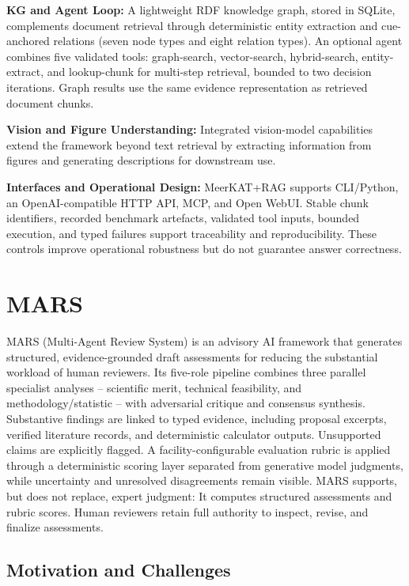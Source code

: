 \documentclass[11pt,twoside]{article}
\begin{document}
\noindent \textbf{KG and Agent Loop:} A lightweight RDF knowledge graph, stored in SQLite, complements document retrieval through deterministic entity extraction and cue-anchored relations (seven node types and eight relation types). An optional agent combines five validated tools: graph-search, vector-search, hybrid-search, entity-extract, and lookup-chunk for multi-step retrieval, bounded to two decision iterations. Graph results use the same evidence representation as retrieved document chunks.

\noindent \textbf{Vision and Figure Understanding:} Integrated vision-model capabilities extend the framework beyond text retrieval by extracting information from figures and generating descriptions for downstream use.

\noindent \textbf{Interfaces and Operational Design:} MeerKAT+RAG supports CLI/Python, an OpenAI-compatible HTTP API, MCP, and Open WebUI. Stable chunk identifiers, recorded benchmark artefacts, validated tool inputs, bounded execution, and typed failures support traceability and reproducibility. These controls improve operational robustness but do not guarantee answer correctness.

\section{MARS}

MARS (Multi-Agent Review System) is an advisory AI framework that generates structured, evidence-grounded draft assessments for reducing the substantial workload of human reviewers.
Its five-role pipeline combines three parallel specialist analyses -- scientific merit, technical feasibility, and methodology/statistic -- with adversarial critique and consensus synthesis.
Substantive findings are linked to typed evidence, including proposal excerpts, verified literature records, and deterministic calculator outputs.
Unsupported claims are explicitly flagged.
A facility-configurable evaluation rubric is applied through a deterministic scoring layer separated from generative model judgments, while uncertainty and unresolved disagreements remain visible.
MARS supports, but does not replace, expert judgment:
It computes structured assessments and rubric scores.
Human reviewers retain full authority to inspect, revise, and finalize assessments.

\subsection{Motivation and Challenges}
\end{document}
